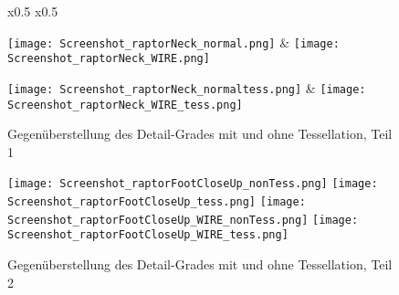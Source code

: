 \begin{figure}[!h]	 	
	\begin{tabular}{ x{0.5\textwidth} x{0.5\textwidth} }

   		\tabularnewline	
   		
		\tabularnewline   		
		\tabularnewline
		
		\texttt{[image: Screenshot\_raptorNeck\_normal.png]} 
		&
		\texttt{[image: Screenshot\_raptorNeck\_WIRE.png]} 
		\tabularnewline
		
		\tabularnewline
		
		\texttt{[image: Screenshot\_raptorNeck\_normaltess.png]}
		&
		\texttt{[image: Screenshot\_raptorNeck\_WIRE\_tess.png]}
		\tabularnewline

			
		

	\end{tabular}
	\caption{Gegenüberstellung des Detail-Grades mit und ohne Tessellation, Teil 1}
	\label{fig:sefef}
\end{figure}

\begin{figure}[!h]	 	
	\texttt{[image: Screenshot\_raptorFootCloseUp\_nonTess.png]} 
	\texttt{[image: Screenshot\_raptorFootCloseUp\_tess.png]} 
	\texttt{[image: Screenshot\_raptorFootCloseUp\_WIRE\_nonTess.png]} 
	\texttt{[image: Screenshot\_raptorFootCloseUp\_WIRE\_tess.png]} 

	\caption{Gegenüberstellung des Detail-Grades mit und ohne Tessellation, Teil 2}
	\label{fig:gegenueberstellungTessNonTess}
\end{figure}




\clearpage

